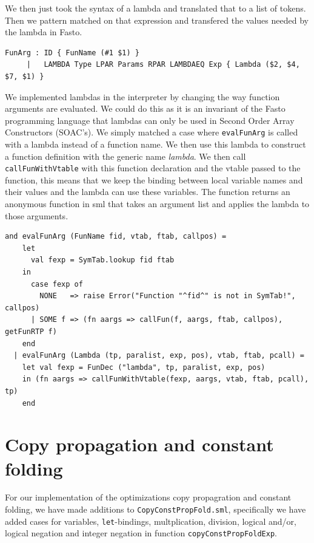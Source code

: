 \documentclass[11pt]{article}
\begin{document}
    We then just took the syntax of a lambda and translated that to a list of
    tokens.  Then we pattern matched on that expression and transfered the
    values needed by the lambda in Fasto.

    \begin{lstlisting}[basicstyle=\small]
FunArg : ID { FunName (#1 $1) }
     |   LAMBDA Type LPAR Params RPAR LAMBDAEQ Exp { Lambda ($2, $4, $7, $1) }
    \end{lstlisting}

    We implemented lambdas in the interpreter by changing the way function
    arguments are evaluated.  We could do this as it is an invariant of the
    Fasto programming language that lambdas can only be used in Second Order
    Array Constructors (SOAC's).  We simply matched a case where
    \texttt{evalFunArg} is called with a lambda instead of a function name.  We
    then use this lambda to construct a function definition with the generic
    name \textit{lambda}.  We then call \texttt{callFunWithVtable} with this
    function declaration and the vtable passed to the function, this means that
    we keep the binding between local variable names and their values and the
    lambda can use these variables.  The function returns an anonymous function
    in sml that takes an argument list and applies the lambda to those
    arguments.

    \begin{lstlisting}[basicstyle=\small]
and evalFunArg (FunName fid, vtab, ftab, callpos) =
    let
      val fexp = SymTab.lookup fid ftab
    in
      case fexp of
        NONE   => raise Error("Function "^fid^" is not in SymTab!", callpos)
      | SOME f => (fn aargs => callFun(f, aargs, ftab, callpos), getFunRTP f)
    end
  | evalFunArg (Lambda (tp, paralist, exp, pos), vtab, ftab, pcall) =
    let val fexp = FunDec ("lambda", tp, paralist, exp, pos)
    in (fn aargs => callFunWithVtable(fexp, aargs, vtab, ftab, pcall), tp)
    end
    \end{lstlisting}

    \section{Copy propagation and constant folding}
	For our implementation of the optimizations copy propagration and constant
	folding, we have made additions to \texttt{CopyConstPropFold.sml}, specifically
	we have added cases for variables, \texttt{let}-bindings, multplication,
	division, logical and/or, logical negation and integer negation in function
	\texttt{copyConstPropFoldExp}.
\end{document}
